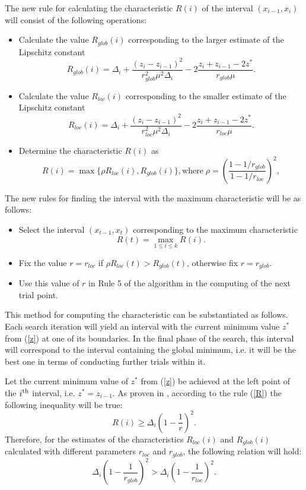 \documentclass[runningheads]{llncs}
\begin{document}
The new rule for calculating the characteristic $R(i)$ of the interval $(x_{i-1}, x_i)$ will consist of the following operations:
\begin{itemize}
\item
Calculate the value $R_{glob}(i)$ corresponding to the larger estimate of the Lipschitz constant
\[
R_{glob}(i)=\Delta_i+\frac{(z_i-z_{i-1})^2}{r_{glob}^2\mu^2\Delta_i}-2\frac{z_i+z_{i-1}-2z^*}{r_{glob}\mu}.
\]
\item
Calculate the value $R_{loc}(i)$ corresponding to the smaller estimate of the Lipschitz constant
\[
R_{loc}(i)=\Delta_i+\frac{(z_i-z_{i-1})^2}{r_{loc}^2\mu^2\Delta_i}-2\frac{z_i+z_{i-1}-2z^*}{r_{loc}\mu}.
\]
\item
Determine the characteristic $R(i)$ as
\begin{equation}\label{pho}
R(i) = \max\{\rho R_{loc}(i),R_{glob}(i)\}, \textrm{where} \; \rho = \left(\frac{1-1/r_{glob}}{1-1/r_{loc}}\right)^2,
\end{equation}   
\end{itemize}

The new rules for finding the interval with the maximum characteristic will be as follows:
\begin{itemize}
\item 
Select the interval $(x_{t-1},x_t)$ corresponding to the maximum characteristic
\[
R(t)= \max_{1 \leq i \leq k}R(i).
\]
\item
Fix the value $r = r_{loc}$ if $\rho R_{loc}(t) > R_{glob}(t)$, otherwise fix $r=r_{glob}$.
\item
Use this value of $r$ in Rule 5 of the algorithm in the computing of the next trial point.
\end{itemize}


This method for computing the characteristic can be substantiated as follows. 
Each search iteration will yield an interval with the current minimum value $z^*$ from (\ref{z}) at one of its boundaries. In the final phase of the search, this interval will correspond to the interval containing the global minimum, i.e. it will be the best one in terms of conducting further trials within it.

Let the current minimum value of $z^*$ from (\ref{z}) be achieved at the left point of the $i^{\rm th}$ interval, i.e. $z^* = z_{i-1}$. 
As proven in \cite{Strongin2000}, according to the rule (\ref{R}) the following inequality will be true: 
\[
R(i) \geq \Delta_i \left( 1 - \frac{1}{r} \right)^2.
\]
Therefore, for the estimates of the characteristics $R_{loc}(i)$ and $R_{glob}(i)$ calculated with different parameters $r_{loc}$ and $r_{glob}$, the following relation will hold:
\[
	\Delta_i \left( 1 - \frac{1}{r_{glob}} \right)^2 > \Delta_i \left( 1 - \frac{1}{r_{loc}} \right)^2.
\]
\end{document}
